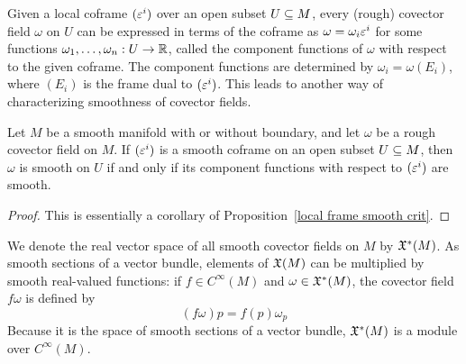 Given a local coframe $(\varepsilon^i)$ over an open subset $U\subseteq M$, every (rough) covector field $\omega$ on $U$ can be expressed in terms of the coframe as $\omega=\omega_i\varepsilon^i$ for some functions $\omega_1,\dots,\omega_n:U\to\mathbb{R}$, called the component functions of $\omega$ with respect to the given coframe. The component functions are determined by $\omega_i=\omega(E_i)$, where $(E_i)$ is the frame dual to $(\varepsilon^i)$. This leads to another way of characterizing smoothness of covector fields.
\begin{proposition}
Let $M$ be a smooth manifold with or without boundary, and let $\omega$ be a rough covector field on $M$. If $(\varepsilon^i)$ is a smooth coframe on an open subset $U\subseteq M$, then $\omega$ is smooth on $U$ if and only if its component functions with respect to $(\varepsilon^i)$ are smooth.
\end{proposition}
\begin{proof}
This is essentially a corollary of Proposition~\ref{local frame smooth crit}.
\end{proof}
We denote the real vector space of all smooth covector fields on $M$ by $\mathfrak{X}^*(M)$. As smooth sections of a vector bundle, elements of $\mathfrak{X}(M)$ can be multiplied by smooth real-valued functions: if $f\in C^\infty(M)$ and $\omega\in\mathfrak{X}^*(M)$, the covector field $f\omega$ is defined by
\[(f\omega)p=f(p)\omega_p\]
Because it is the space of smooth sections of a vector bundle, $\mathfrak{X}^*(M)$ is a module over $C^\infty(M)$.\par

